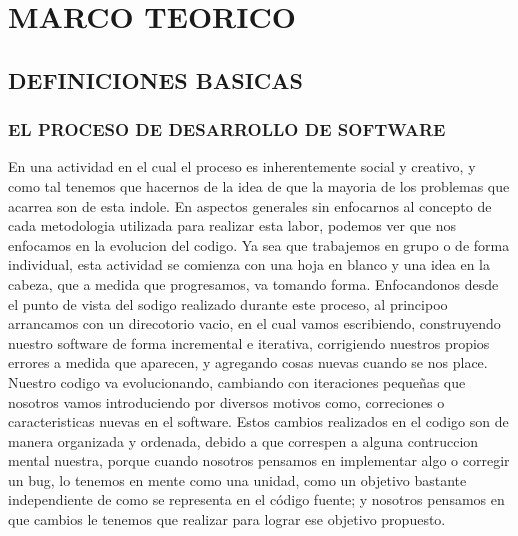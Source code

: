 



%

\chapter{MARCO TEORICO}
\section{DEFINICIONES BASICAS}
\subsection{EL PROCESO DE DESARROLLO DE SOFTWARE}
En una actividad en el cual el proceso es inherentemente social y creativo,  y como tal tenemos que hacernos de la idea de que la mayoria de los problemas que acarrea son de esta indole.
En aspectos generales sin enfocarnos al concepto de cada metodologia utilizada para realizar esta labor, podemos ver que nos enfocamos en la evolucion del codigo.
Ya sea que trabajemos en grupo o de forma individual, esta actividad se comienza con una hoja en blanco y una idea en la cabeza, que a medida que progresamos, va tomando forma.
Enfocandonos desde el punto de vista del sodigo realizado durante este proceso, al principoo arrancamos con un direcotorio vacio, en el cual vamos escribiendo, construyendo nuestro software
de forma incremental e iterativa, corrigiendo nuestros propios errores a medida que aparecen, y agregando cosas nuevas cuando se nos place.
Nuestro codigo va evolucionando, cambiando con iteraciones pequeñas que nosotros vamos introduciendo por diversos motivos como, correciones o caracteristicas nuevas en el software.
Estos cambios realizados en el codigo son de manera organizada y ordenada, debido a que correspen a alguna contruccion mental nuestra, porque cuando nosotros pensamos en implementar algo o corregir un bug, lo tenemos en mente como una unidad, como un objetivo bastante independiente de como se representa en el código fuente; y nosotros 
pensamos en que cambios le tenemos que realizar para lograr ese objetivo propuesto.

